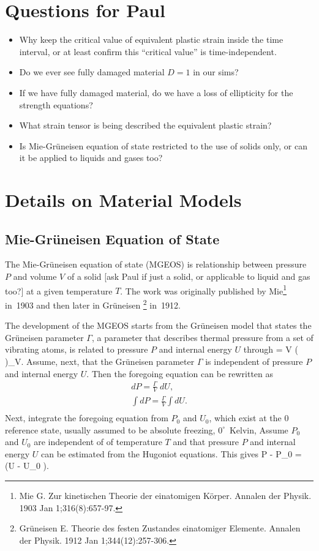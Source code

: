 \documentclass[12pt,reqno]{amsart}
\newcommand{\Gru}{Gr\"uneisen }
\begin{document}
\section{Questions for Paul}
\begin{itemize}
\item Why keep the critical value of equivalent plastic strain inside the 
time interval, or at least confirm this ``critical value'' is time-independent.
\item Do we ever see fully damaged material $D=1$ in our sims?
\item If we have fully damaged material, do we have a loss of ellipticity 
for the strength equations?
\item What strain tensor is being described the equivalent plastic strain?
\item Is Mie-Gr\"uneisen equation of state restricted to the use of solids
only, or can it be applied to liquids and gases too?
\end{itemize}

\pagebreak
\appendix
\section{Details on Material Models}

\subsection{Mie-\Gru Equation of State}
The Mie-\Gru equation of state (MGEOS) is relationship between pressure $P$
and volume $V$ of a solid [ask Paul if just a solid, 
or applicable to liquid and gas too?] at a given temperature $T$.  
The work was originally published by Mie\footnote{Mie G. Zur kinetischen 
Theorie der einatomigen Körper. Annalen der Physik. 1903 Jan 1;316(8):657-97.}
in~1903 and then later in \Gru\footnote{\Gru E. 
Theorie des festen Zustandes einatomiger Elemente. 
Annalen der Physik. 1912 Jan 1;344(12):257-306.} in~1912.  

The development of the MGEOS starts from the \Gru model that states the
\Gru parameter $\Gamma$, a parameter that describes thermal pressure 
from a set of vibrating atoms, is related to pressure $P$ and internal
energy $U$ through
\be
\Gamma = V \left(  \right)_V.
\ee
Assume, next, that the \Gru parameter $\Gamma$ is independent of 
pressure $P$ and internal energy $U$.  Then the foregoing equation
can be rewritten as
\begin{align}
  dP = \frac{\Gamma}{V} \; dU, \\
  \int dP = \frac{\Gamma}{V} \int dU.  \\
\end{align}
Next, integrate the foregoing equation from 
$P_0$ and $U_0$, which exist at the $0$ 
reference state, 
usually assumed to be absolute freezing, $0^{\circ}$~Kelvin, 
Assume $P_0$ and $U_0$ are independent of of temperature $T$ and that
pressure $P$ and internal energy $U$ can be estimated from the 
Hugoniot equations.  This gives
\be
 P - P_0 =  \left(U - U_0 \right).
\ee
\end{document}
